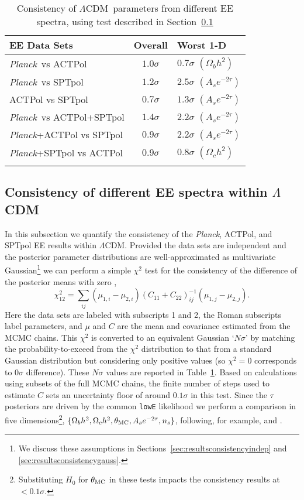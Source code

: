 \documentclass[twocolumn]{aastex63}
\newcommand{\be}{\begin{equation}}
\newcommand{\ee}{\end{equation}}
\newcommand{\planck}{\textsl{Planck}}
\newcommand{\lcdm}{\ensuremath{\Lambda\mathrm{CDM}}}
\begin{document}
\begin{table}
  \centering
  \caption{Consistency of \lcdm\ parameters from different EE spectra, using test described in Section~\ref{sec:resultsconsistency}}
  \begin{tabular}{lcl}
\hline
\hline
EE Data Sets&Overall&Worst 1-D\\
\hline
\planck\ vs ACTPol&$1.0\sigma$&$0.7\sigma$ $(\Omega_bh^2)$\\
\planck\ vs SPTpol&$1.2\sigma$&$2.5\sigma$ $(A_se^{-2\tau})$\\
ACTPol vs SPTpol&$0.7\sigma$&$1.3\sigma$ $(A_se^{-2\tau})$\\
\hline
\planck\ vs ACTPol+SPTpol&$1.4\sigma$&$2.2\sigma$ $(A_se^{-2\tau})$\\
\planck+ACTPol vs SPTpol&$0.9\sigma$&$2.2\sigma$ $(A_se^{-2\tau})$\\
\planck+SPTpol vs ACTPol&$0.9\sigma$&$0.8\sigma$ $(\Omega_ch^2)$\\
\hline
\label{table:consistency}
\end{tabular}
\end{table}

\subsection{Consistency of different EE spectra within $\Lambda$CDM}
\label{sec:resultsconsistency}

In this subsection we quantify the consistency of the \planck, ACTPol, and SPTpol EE results within \lcdm. Provided the data sets are independent and the posterior parameter distributions are well-approximated as multivariate Gaussian\footnote{We discuss these assumptions in Sections~\ref{sec:resultsconsistencyindep} and \ref{sec:resultsconsistencygauss}.} we can perform a simple $\chi^2$ test for the consistency of the difference of the posterior means with zero \citep[e.g.,][]{addison/etal:2016,raveri/hu:2019},
\be
\chi^2_{12}=\sum_{ij}\left(\mu_{1,i}-\mu_{2,i}\right)\left(C_{11}+C_{22}\right)^{-1}_{ij}\left(\mu_{1,j}-\mu_{2,j}\right).
\ee
Here the data sets are labeled with subscripts 1 and 2, the Roman subscripts label parameters, and $\mu$ and $C$ are the mean and covariance estimated from the MCMC chains. This $\chi^2$ is converted to an equivalent Gaussian `$N\sigma$' by matching the probability-to-exceed from the $\chi^2$ distribution to that from a standard Gaussian distribution but considering only positive values (so $\chi^2=0$ corresponds to $0\sigma$ difference). These $N\sigma$ values are reported in Table~\ref{table:consistency}. Based on calculations using subsets of the full MCMC chains, the finite number of steps used to estimate $C$ sets an uncertainty floor of around $0.1\sigma$ in this test. Since the $\tau$ posteriors are driven by the common \texttt{lowE} likelihood we perform a comparison in five dimensions\footnote{Substituting $H_0$ for $\theta_{\rm MC}$ in these tests impacts the consistency results at $<0.1\sigma$.}, $\{\Omega_bh^2, \Omega_ch^2, \theta_{\rm MC}, A_se^{-2\tau}, n_s\}$, following, for example, \cite{aiola/etal:2020} and \cite{dutcher/etal:prep}.
\end{document}
